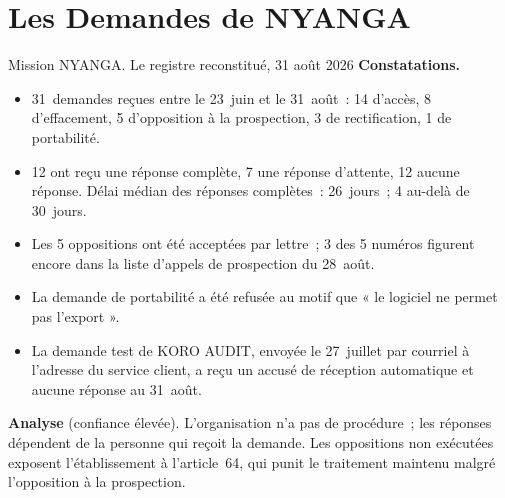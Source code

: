 \section{Les Demandes de NYANGA}
\label{sec:c06-nyanga}

\begin{boxscenario}{Mission NYANGA. Le registre reconstitué, 31 août 2026}
\textbf{Constatations.}
\begin{itemize}
    \item 31~demandes reçues entre le 23~juin et le 31~août~: 14 d'accès,
          8 d'effacement, 5 d'opposition à la prospection, 3 de
          rectification, 1 de portabilité.
    \item 12 ont reçu une réponse complète, 7 une réponse d'attente, 12
          aucune réponse. Délai médian des réponses complètes~: 26~jours~;
          4 au-delà de 30~jours.
    \item Les 5 oppositions ont été acceptées par lettre~; 3 des 5 numéros
          figurent encore dans la liste d'appels de prospection du 28~août.
    \item La demande de portabilité a été refusée au motif que « le
          logiciel ne permet pas l'export ».
    \item La demande test de KORO AUDIT, envoyée le 27~juillet par courriel à
          l'adresse du service client, a reçu un accusé de réception
          automatique et aucune réponse au 31~août.
\end{itemize}

\textbf{Analyse} (confiance élevée). L'organisation n'a pas de procédure~;
les réponses dépendent de la personne qui reçoit la demande. Les
oppositions non exécutées exposent l'établissement à l'article~64, qui
punit le traitement maintenu malgré l'opposition à la prospection.
\end{boxscenario}

